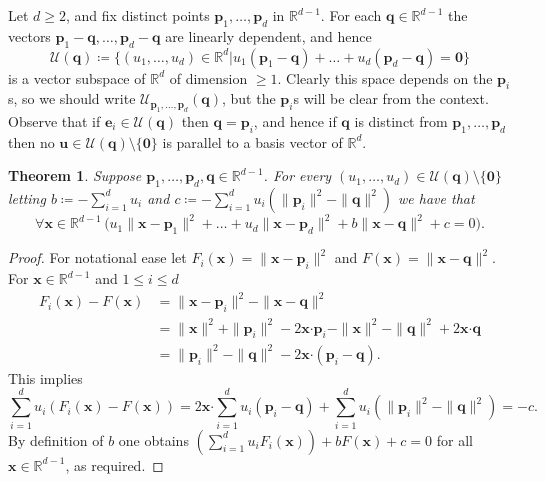 \documentclass[12pt]{amsart}
\newcommand{\FORALL}[1]{\forall {#1} \, }
\newcommand{\R}{\mathbb{R}}	%
\newcommand{\Mid}{\boldsymbol\mid}			%
\newcommand{\set}[1]{\mathopen \{ {#1} \mathclose \}} %
\newcommand{\setof}[2]{\mathopen \{{#1}\Mid{#2} \mathclose\}} %
\theoremstyle{plain}
\newtheorem{theorem}{Theorem}[section]
\theoremstyle{definition}
\theoremstyle{remark}
\begin{document}
Let \( d \geq 2 \), and fix distinct points \( \mathbf{p}_1 , \dots , \mathbf{p}_d \) in \( \R^{ d - 1} \).
For each \( \mathbf{q} \in \R^{ d - 1} \) the vectors \( \mathbf{p}_1 - \mathbf{q} , \dots , \mathbf{p}_d - \mathbf{q} \) are linearly dependent, and hence 
\begin{equation}\label{eq:U}
\mathcal{U} ( \mathbf{q} ) \coloneqq \setof{ ( u_1 , \dots , u_d ) \in \R^d}{ u_1 ( \mathbf{p}_1 - \mathbf{q} ) + \dots + u_d ( \mathbf{p}_d - \mathbf{q} ) = \mathbf{0} } 
\end{equation}
is a vector subspace of \( \R^d \) of dimension \( \geq 1 \).
Clearly this space depends on the \( \mathbf{p}_i \)s, so we should write \( \mathcal{U}_{\mathbf{p}_1, \dots , \mathbf{p}_d } ( \mathbf{q} ) \), but the \( \mathbf{p}_i \)s will be clear from the context.
Observe that if \( \mathbf{e}_i \in \mathcal{U} ( \mathbf{q} ) \) then \( \mathbf{q} = \mathbf{p}_i \), and hence if \( \mathbf{q} \) is distinct from \( \mathbf{p}_1 , \dots , \mathbf{p}_d \) then no \( \mathbf{u} \in \mathcal{U} ( \mathbf{q} ) \setminus \set{ \mathbf{0}} \) is parallel to a basis vector of \( \R^d \).

\begin{theorem}\label{th:Ivan}
Suppose \( \mathbf{p}_1 , \dots , \mathbf{p}_d , \mathbf{q} \in \R^{ d - 1 } \).
For every \( ( u_1 , \dots , u_d ) \in \mathcal{U} ( \mathbf{q} ) \setminus \set{ \mathbf{0} } \) letting \( b \coloneqq - \sum_{ i = 1 }^{ d } u_i \) and \( c \coloneqq - \sum_{ i = 1 }^{ d } u_i ( \| \mathbf{p}_i \|^2 - \| \mathbf{q} \|^2 ) \) we have that
\[
\FORALL{ \mathbf{x} \in \R^{ d - 1} } \bigl ( u_1 \| \mathbf{x} - \mathbf{p}_1 \|^2 + \dots + u_d \| \mathbf{x} - \mathbf{p}_d \|^2 + b \| \mathbf{x} - \mathbf{q} \|^2 + c = 0 \bigr ) .
\]
\end{theorem}

\begin{proof}
For notational ease let \( F_i ( \mathbf{x} ) = \| \mathbf{x} - \mathbf{p}_i \|^2 \) and \( F ( \mathbf{x} ) = \| \mathbf{x} - \mathbf{q} \|^2 \).
For \( \mathbf{x} \in \R^{ d - 1} \) and \( 1 \leq i \leq d \)
\[
\begin{split}
F_i ( \mathbf{x} ) - F ( \mathbf{x} ) & = \| \mathbf{x} - \mathbf{p}_i \|^2 - \| \mathbf{x} - \mathbf{q} \|^2
\\
 & = \| \mathbf{x} \|^2 + \| \mathbf{p}_i \|^2 - 2 \mathbf{x} \boldsymbol{\cdot} \mathbf{p}_i - \| \mathbf{x} \|^2 - \| \mathbf{q} \|^2 + 2 \mathbf{x} \boldsymbol{\cdot} \mathbf{q}
 \\
 & = \| \mathbf{p}_i \|^2 - \| \mathbf{q} \|^2 - 2 \mathbf{x} \boldsymbol{\cdot} ( \mathbf{p}_i - \mathbf{q} ) .
\end{split}
\]
This implies
\[
\sum_{i=1}^d u_i ( F_i ( \mathbf{x} ) - F ( \mathbf{x} ) ) = 2 \mathbf{x} \boldsymbol{\cdot} \sum_{i=1}^d u_i ( \mathbf{p}_i - \mathbf{q} ) + \sum_{ i = 1 }^d u_i ( \| \mathbf{p}_i \|^2 - \| \mathbf{q} \|^2 ) = - c .
\]
By definition of \( b \) one obtains \( ( \sum_{i=1}^d u_i F_i ( \mathbf{x} ) ) + b F ( \mathbf{x} ) + c = 0 \) for all \( \mathbf{x} \in \R^{ d - 1} \), as required.
\end{proof}
\end{document}
